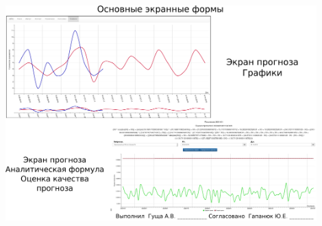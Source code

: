 \documentclass[russian,utf8, a1paper, emptystyle]{eskdgraph}
\begin{document}
\begin{ESKDdrawing}
\includegraphics[width=0.90\textwidth]{lists/list9_2}
\end{ESKDdrawing}

%
%
%
%
%
%
%
%
%
%
%
%
\end{document}
